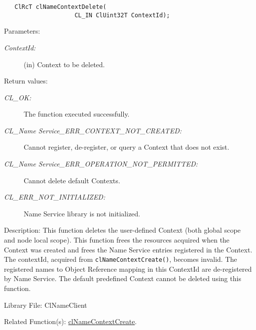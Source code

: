 \begin{flushleft}
\begin{Desc}
\footnotesize\begin{verbatim}   ClRcT clNameContextDelete(
					CL_IN ClUint32T ContextId);
\end{verbatim}
\normalsize
\end{Desc}
\begin{Desc}
\item[Parameters:]
\begin{description}
\item[{\em Context\-Id:}](in) Context to be deleted.\end{description}
\end{Desc}
\begin{Desc}
\item[Return values:]
\begin{description}
\item[{\em CL\_\-OK:}]The function executed successfully. 
\item[{\em CL\_\-Name Service\_\-ERR\_\-CONTEXT\_\-NOT\_\-CREATED:}]Cannot register, de-register, or query a Context that does not exist.
\item[{\em CL\_\-Name Service\_\-ERR\_\-OPERATION\_\-NOT\_\-PERMITTED:}]Cannot delete default Contexts.
\item[{\em CL\_\-ERR\_\-NOT\_\-INITIALIZED:}]Name Service library is not initialized.\end{description}
\end{Desc}
\begin{Desc}
\item[Description:]This function deletes the user-defined Context (both global scope and node local scope). This function frees the resources acquired when the
Context was created and frees the Name Service entries registered in the Context. The contextId, acquired from {\tt{clNameContextCreate()}}, becomes invalid. 
The registered names to Object Reference mapping in this ContextId are de-registered by Name Service. 
The default predefined Context cannot be deleted using this function. 
\end{Desc}
\begin{Desc}
\item[Library File:]Cl\-Name\-Client\end{Desc}
\begin{Desc}
\item[Related Function(s):]\hyperlink{pagens106}{cl\-Name\-Context\-Create}. \end{Desc}
\newpage



\end{flushleft}
